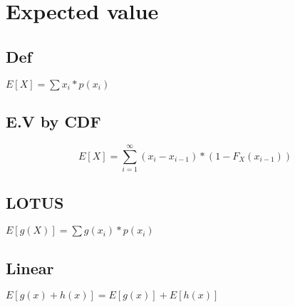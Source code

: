 \section{Expected value}
    \subsection*{Def}
        $E[X]=\sum x_i*p(x_i)$

    \subsection*{E.V by CDF}
        \[E[X]=\sum_{i=1}^{\infty} (x_i-x_{i-1})*(1-F_X(x_{i-1}))\]

    \subsection*{LOTUS}
        $E[g(X)]=\sum g(x_i)*p(x_i)$

    \subsection*{Linear}
        $E[g(x) + h(x)] = E[g(x)] + E[h(x)]$